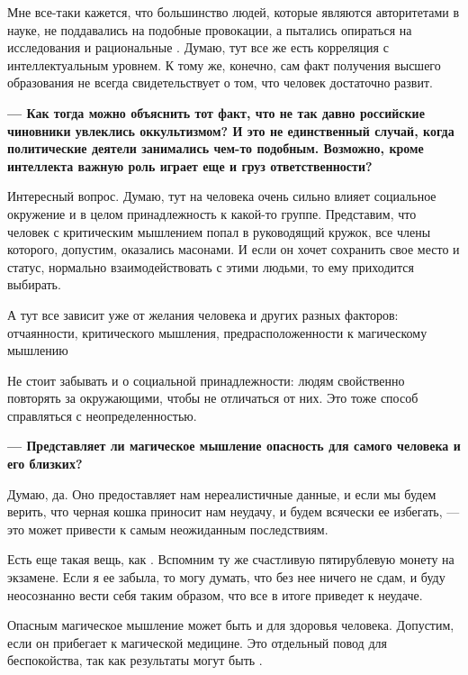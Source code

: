 Мне все-таки кажется, что большинство людей, которые являются авторитетами в науке, не поддавались на подобные провокации, а пытались опираться на исследования и рациональные . Думаю, тут все же есть корреляция с интеллектуальным уровнем. К тому же, конечно, сам факт получения высшего образования не всегда свидетельствует о том, что человек достаточно развит.

\textbf{--- Как тогда можно объяснить тот факт, что не так давно российские чиновники увлеклись оккультизмом? И это не единственный случай, когда политические деятели занимались чем-то подобным. Возможно, кроме интеллекта важную роль играет еще и груз ответственности?}

Интересный вопрос. Думаю, тут на человека очень сильно влияет социальное окружение и в целом принадлежность к какой-то группе.
Представим, что человек с критическим мышлением попал в руководящий кружок, все члены которого, допустим, оказались масонами. И если он хочет сохранить свое место и статус, нормально взаимодействовать с этими людьми, то ему приходится выбирать.

\begin{fancyquotes}
    А тут все зависит уже от желания человека и других разных факторов: отчаянности, критического мышления, предрасположенности к магическому мышлению
\end{fancyquotes}

Не стоит забывать и о социальной принадлежности: людям свойственно повторять за окружающими, чтобы не отличаться от них. Это тоже способ справляться с неопределенностью.

\textbf{--- Представляет ли магическое мышление опасность для самого человека и его близких?}

Думаю, да. Оно предоставляет нам нереалистичные данные, и если мы будем верить, что черная кошка приносит нам неудачу, и будем всячески ее избегать, — это может привести к самым неожиданным последствиям.

Есть еще такая вещь, как . Вспомним ту же счастливую пятирублевую монету на экзамене. Если я ее забыла, то могу думать, что без нее ничего не сдам, и буду неосознанно вести себя таким образом, что все в итоге приведет к неудаче.

Опасным магическое мышление может быть и для здоровья человека. Допустим, если он прибегает к магической медицине. Это отдельный повод для беспокойства, так как результаты могут быть .

